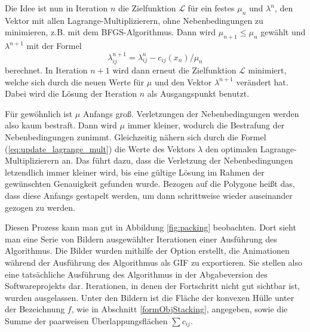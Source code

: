 \documentclass[runningheads,a4paper]{llncs}
\begin{document}
Die Idee ist nun in Iteration $n$ die Zielfunktion $\mathcal{L}$ für ein festes $\mu_n$ und $\lambda^n$, den Vektor mit allen Lagrange-Multiplizierern, ohne Nebenbedingungen zu minimieren, z.B. mit dem BFGS-Algorithmus. Dann wird ${\mu_{n+1} \le \mu_n}$ gewählt und $\lambda^{n+1}$ mit der Formel
\begin{equation}
\label{eq:update_lagrange_mult}
\lambda_{ij}^{n+1} = \lambda_{ij}^n - c_{ij}(x_n)/\mu_n 
\end{equation}
berechnet.
In Iteration $n+1$ wird dann erneut die Zielfunktion $\mathcal{L}$ minimiert, welche sich durch die neuen Werte für $\mu$ und den Vektor $\lambda^{n+1}$ verändert hat. Dabei wird die Lösung der Iteration $n$ als Ausgangspunkt benutzt.

Für gewöhnlich ist $\mu$ Anfangs groß. Verletzungen der Nebenbedingungen werden also kaum bestraft. Dann wird $\mu$ immer kleiner, wodurch die Bestrafung der Nebenbedingungen zunimmt. Gleichzeitig nähern sich durch die Formel (\ref{eq:update_lagrange_mult}) die Werte des Vektors $\lambda$ den optimalen Lagrange-Multiplizierern an. \cite{nocedal1999numerical} Das führt dazu, dass die Verletzung der Nebenbedingungen letzendlich immer kleiner wird, bis eine gültige Lösung im Rahmen der gewünschten Genauigkeit gefunden wurde. Bezogen auf die Polygone heißt das, dass diese Anfangs gestapelt werden, um dann schrittweise wieder auseinander gezogen zu werden.

Diesen Prozess kann man gut in Abbildung \ref{fig:packing} beobachten. Dort sieht man eine Serie von Bildern ausgewählter Iterationen einer Ausführung des Algorithmus. Die Bilder wurden mithilfe der Option erstellt, die Animationen während der Ausführung des Algorithmus als GIF zu exportieren. Sie stellen also eine tatsächliche Ausführung des Algorithmus in der Abgabeversion des Softwareprojekts dar. Iterationen, in denen der Fortschritt nicht gut sichtbar ist, wurden ausgelassen. Unter den Bildern ist die Fläche der konvexen Hülle unter der Bezeichnung $f$, wie in Abschnitt \ref{formObjStacking}, angegeben, sowie die Summe der paarweisen Überlappungsflächen $\sum c_{ij}$.
\end{document}
